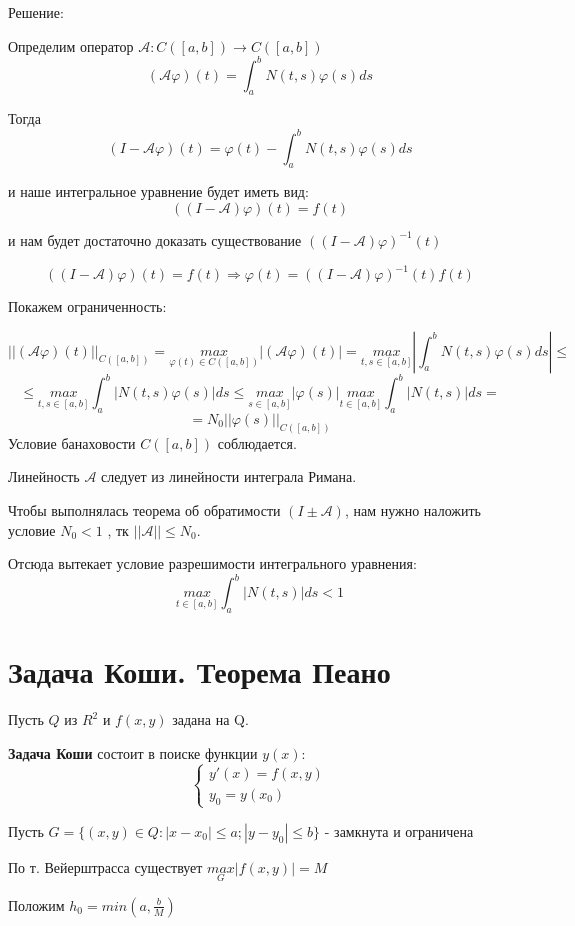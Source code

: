 \documentclass[12pt]{article}
\begin{document}
Решение:

	Определим оператор $\mathcal{A}: C([a,b]) \to  C([a,b])$ 
	$$(\mathcal{A}\varphi)(t) = \int_a^b N(t,s)\varphi(s)ds$$
	
	Тогда $$(I - \mathcal{A}\varphi)(t) = \varphi(t) - \int_a^b N(t,s)\varphi(s)ds$$
	
	и наше интегральное уравнение будет иметь вид:
	$$((I - \mathcal{A})\varphi)(t) = f(t)$$
	
	и нам будет достаточно доказать существование $((I - \mathcal{A})\varphi)^{-1}(t)$
	
	$$((I - \mathcal{A})\varphi)(t) = f(t) \Rightarrow \varphi(t) = ((I - \mathcal{A})\varphi)^{-1}(t) f(t) $$
	
	Покажем ограниченность:
	
	$$||(\mathcal{A}\varphi)(t)||_{C([a,b])} = \underset{\varphi(t) \in C([a,b])} {max} |(\mathcal{A}\varphi)(t)| = \underset{t,s \in [a,b]}{max}|\int_a^b N(t,s)\varphi(s)ds| \le $$
	$$\le \underset{t,s \in [a,b]} {max} \int_a^b |N(t,s)\varphi(s)|ds \le \underset{s \in [a,b]} {max} |\varphi(s)| 
    \underset{t \in [a,b]} {max}\int_a^b |N(t,s)|ds = $$
	$$ = N_0||\varphi(s)||_{C([a,b])}	$$
	Условие банаховости $C([a,b])$ соблюдается.
	
	Линейность $\mathcal{A}$ следует из линейности интеграла Римана.
	
	Чтобы выполнялась теорема об обратимости $(I \pm \mathcal{A})$, нам нужно наложить условие $N_0 < 1$
, тк $||\mathcal{A}|| \le N_0$. 

Отсюда вытекает условие разрешимости интегрального уравнения:
	$$\underset{t \in [a,b]} {max}\int_a^b |N(t,s)|ds < 1$$ 
	

\section{Задача Коши. Теорема Пеано}
	Пусть $Q$ из $R^2$ и $f(x,y)$ задана на Q.
	
	\textbf{Задача Коши} состоит в поиске функции $y(x)$:
$$
\begin{cases}
   y'(x) = f(x,y) \\
   y_0 = y(x_0)
\end{cases}
$$

Пусть $G = \{(x,y) \in Q : |x - x_0| \le a; |y - y_0| \le b \}$ - замкнута и ограничена

По т. Вейерштрасса существует $\underset{G}{max} |f(x,y)| = M$

Положим $h_0 = min(a , \frac{b}{M})$
\end{document}
